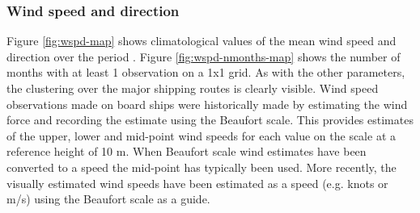 \subsubsection{Wind speed and direction}
Figure \ref{fig:wspd-map} shows climatological values of the mean wind speed and direction over the period \datatimerange{}. 
Figure \ref{fig:wspd-nmonths-map} shows the number of months with at least 1 observation on a 1x1 grid. 
As with the other parameters, the clustering over the major shipping routes is clearly visible. 
Wind speed observations made on board ships were historically made by estimating the wind force and recording the estimate using the Beaufort scale. 
This provides estimates of the upper, lower and mid-point wind speeds for each value on the scale at a reference height of 10 m. 
When Beaufort scale wind estimates have been converted to a speed the mid-point has typically been used. 
More recently, the visually estimated wind speeds have been estimated as a speed (e.g. knots or m/s) using the Beaufort scale as a guide. 

